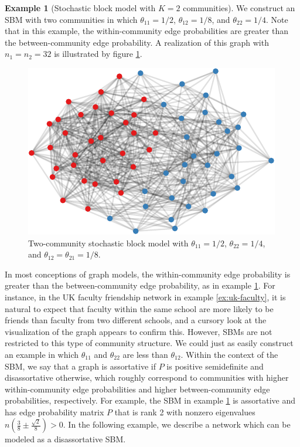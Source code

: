 \documentclass[
  11pt,
]{article}
\theoremstyle{definition}
\theoremstyle{definition}
\newtheorem{example}{Example}[section]
\theoremstyle{definition}
\theoremstyle{definition}
\theoremstyle{remark}
\begin{document}
\begin{example}[Stochastic block model with $K = 2$ communities]
\label{ex:assort-sbm}
We construct an SBM with two communities in which $\theta_{11} = 1/2$, $\theta_{12} = 1/8$, and $\theta_{22} = 1/4$. 
Note that in this example, the within-community edge probabilities are greater than the between-community edge probability. 
A realization of this graph with $n_1 = n_2 = 32$ is illustrated by figure \ref{fig:assort-sbm}.

\begin{figure}[H]

{\centering \includegraphics{draft_files/figure-latex/assort-sbm-1} 

}

\caption{Two-community stochastic block model with $\theta_{11}=1/2$, $\theta_{22}=1/4$, and $\theta_{12} = \theta_{21} = 1/8$.}\label{fig:assort-sbm}
\end{figure}
\end{example}

In most conceptions of graph models, the within-community edge probability is greater than the between-community edge probability, as in example \ref{ex:assort-sbm}.
For instance, in the UK faculty friendship network in example \ref{ex:uk-faculty}, it is natural to expect that faculty within the same school are more likely to be friends than faculty from two different schools, and a cursory look at the visualization of the graph appears to confirm this.
However, SBMs are not restricted to this type of community structure.
We could just as easily construct an example in which \(\theta_{11}\) and \(\theta_{22}\) are less than \(\theta_{12}\). Within the context of the SBM, we say that a graph is assortative if \(P\) is positive semidefinite and disassortative otherwise, which roughly correspond to communities with higher within-community edge probabilities and higher between-community edge probabilities, respectively.
For example, the SBM in example \ref{ex:assort-sbm} is assortative and has edge probability matrix \(P\) that is rank 2 with nonzero eigenvalues \(n (\frac{3}{8} \pm \frac{\sqrt{2}}{8}) > 0\).
In the following example, we describe a network which can be modeled as a disassortative SBM.
\end{document}
